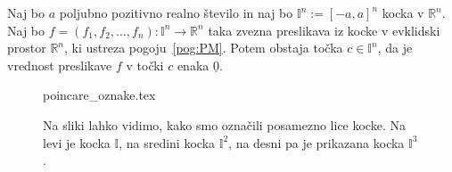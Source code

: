 \documentclass[mat1]{fmfdelo}
\newcommand{\R}{\mathbb R}
\newcommand{\I}{\mathbb I}
\newcommand{\0}{\underline{0}}
\begin{document}


\begin{izrek}\label{izr:PM}
Naj bo $a$ poljubno pozitivno realno število in naj bo $\I^n := [-a, a]^n$ kocka v $\R^n$. Naj bo $f = (f_1, f_2, \dots, f_n) : \I^n  \to \R^n$ taka zvezna preslikava iz kocke v evklidski prostor $\R^n$, ki ustreza pogoju~\eqref{pog:PM}. Potem obstaja točka $c \in \I^n$, da je vrednost preslikave $f$ v točki $c$ enaka $\0$.
\end{izrek}
\begin{figure}[h!]
	\centering
	{poincare_oznake.tex}
	\caption{Na sliki lahko vidimo, kako smo označili posamezno lice kocke. Na levi je kocka $\I$, na sredini kocka $\I^2$, na desni pa je prikazana kocka $\I^3$ .}
\end{figure}
\end{document}
